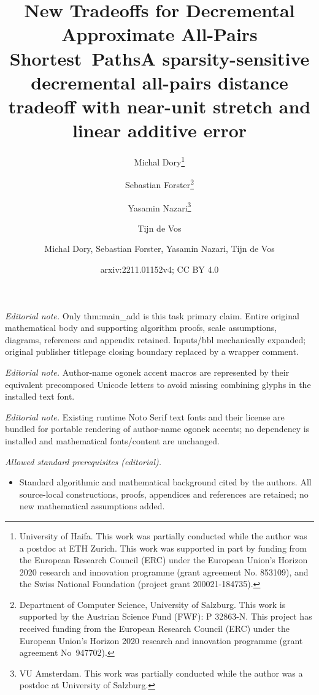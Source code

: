 \documentclass[11pt]{article}
\title{New Tradeoffs for Decremental Approximate All-Pairs Shortest~Paths}
\author{Michal Dory\thanks{University of Haifa. This work was partially conducted while the author was a postdoc at ETH Zurich. This work was supported in part by funding from the European Research Council (ERC) under the European Union’s Horizon 2020 research and innovation programme (grant agreement No. 853109), and the Swiss National Foundation (project grant 200021-184735).} \and  Sebastian Forster\thanks{Department of Computer Science, University of Salzburg. This work is supported by the Austrian Science Fund (FWF): P 32863-N. This project has received funding from the European Research Council (ERC) under the European Union's Horizon 2020 research and innovation programme (grant agreement No~947702).} \and Yasamin Nazari\thanks{VU Amsterdam. This work was partially conducted while the author was a postdoc at University of Salzburg.} \and Tijn de Vos\samethanks[2]}
\date{}
\title{A sparsity-sensitive decremental all-pairs distance tradeoff with near-unit stretch and linear additive error}
\author{Michal Dory, Sebastian Forster, Yasamin Nazari, Tijn de Vos}
\date{arxiv:2211.01152v4; CC BY 4.0}
\theoremstyle{definition}
\theoremstyle{remark}
\begin{document}
\maketitle
\noindent\textit{Editorial note.} Only thm:main\_add is this task primary claim. Entire original mathematical body and supporting algorithm proofs, scale assumptions, diagrams, references and appendix retained. Inputs/bbl mechanically expanded; original publisher titlepage closing boundary replaced by a wrapper comment.\par\medskip
\noindent\textit{Editorial note.} Author-name ogonek accent macros are represented by their equivalent precomposed Unicode letters to avoid missing combining glyphs in the installed text font.\par\medskip
\noindent\textit{Editorial note.} Existing runtime Noto Serif text fonts and their license are bundled for portable rendering of author-name ogonek accents; no dependency is installed and mathematical fonts/content are unchanged.\par\medskip
\noindent\textit{Allowed standard prerequisites (editorial).}\begin{itemize}
\item Standard algorithmic and mathematical background cited by the authors. All source-local constructions, proofs, appendices and references are retained; no new mathematical assumptions added.
\end{itemize}\medskip
\end{document}
